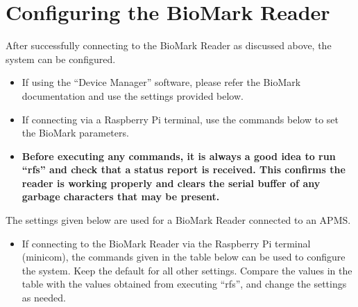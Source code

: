 \documentclass[
  letterpaper,
]{scrbook}
\providecommand{\tightlist}{%
  \setlength{\itemsep}{0pt}\setlength{\parskip}{0pt}}
\begin{document}
\section{Configuring the BioMark
Reader}\label{configuring-the-biomark-reader}

After successfully connecting to the BioMark Reader as discussed above,
the system can be configured.

\begin{itemize}
\item
  If using the ``Device Manager'' software, please refer the BioMark
  documentation and use the settings provided below.
\item
  If connecting via a Raspberry Pi terminal, use the commands below to
  set the BioMark parameters.
\item
  \textbf{Before executing any commands, it is always a good idea to run
  ``rfs'' and check that a status report is received. This confirms the
  reader is working properly and clears the serial buffer of any garbage
  characters that may be present.}
\end{itemize}

The settings given below are used for a BioMark Reader connected to an
APMS.

\begin{itemize}
\tightlist
\item
  If connecting to the BioMark Reader via the Raspberry Pi terminal
  (minicom), the commands given in the table below can be used to
  configure the system. Keep the default for all other settings. Compare
  the values in the table with the values obtained from executing
  ``rfs'', and change the settings as needed.
\end{itemize}
\end{document}
